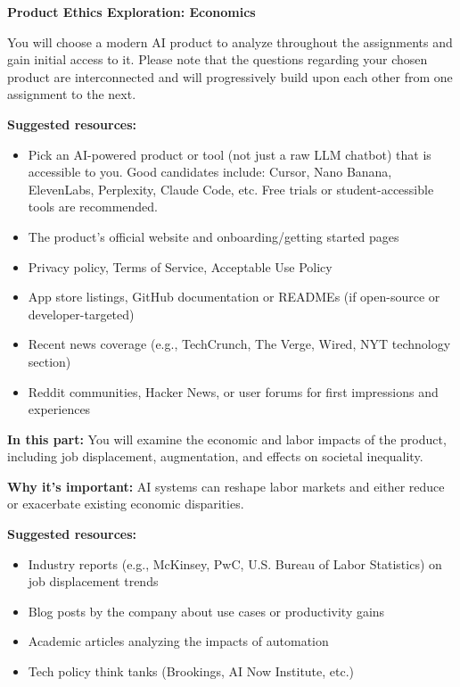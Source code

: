 \item {\bf Product Ethics Exploration: Economics}

You will choose a modern AI product to analyze throughout the assignments and gain initial access to it. Please note that the questions regarding your chosen product are interconnected and will progressively build upon each other from one assignment to the next.

\textbf{Suggested resources:}
\begin{itemize}
    \item Pick an AI-powered product or tool (not just a raw LLM chatbot) that is accessible to you. Good candidates include: Cursor, Nano Banana, ElevenLabs, Perplexity, Claude Code, etc. Free trials or student-accessible tools are recommended.
    \item The product's official website and onboarding/getting started pages
    \item Privacy policy, Terms of Service, Acceptable Use Policy
    \item App store listings, GitHub documentation or READMEs (if open-source or developer-targeted)
    \item Recent news coverage (e.g., TechCrunch, The Verge, Wired, NYT technology section)
    \item Reddit communities, Hacker News, or user forums for first impressions and experiences
\end{itemize}

\textbf{In this part:} You will examine the economic and labor impacts of the product, including job displacement, augmentation, and effects on societal inequality.

\vspace{2mm}

\textbf{Why it's important:} AI systems can reshape labor markets and either reduce or exacerbate existing economic disparities.

\vspace{2mm}

\textbf{Suggested resources:}
\begin{itemize}
  \item Industry reports (e.g., McKinsey, PwC, U.S. Bureau of Labor Statistics) on job displacement trends
  \item Blog posts by the company about use cases or productivity gains
  \item Academic articles analyzing the impacts of automation
  \item Tech policy think tanks (Brookings, AI Now Institute, etc.)
\end{itemize}

\begin{enumerate}

  
  
  
  

\end{enumerate}
